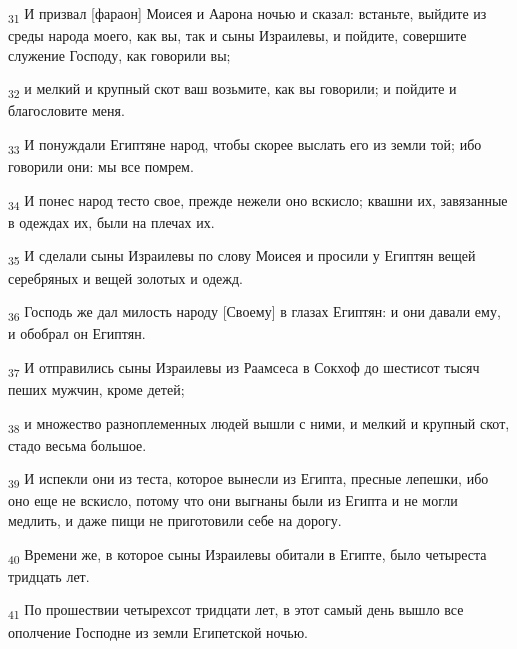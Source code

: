 \begin{tcolorbox}
\textsubscript{31} И призвал [фараон] Моисея и Аарона ночью и сказал: встаньте, выйдите из среды народа моего, как вы, так и сыны Израилевы, и пойдите, совершите служение Господу, как говорили вы;
\end{tcolorbox}
\begin{tcolorbox}
\textsubscript{32} и мелкий и крупный скот ваш возьмите, как вы говорили; и пойдите и благословите меня.
\end{tcolorbox}
\begin{tcolorbox}
\textsubscript{33} И понуждали Египтяне народ, чтобы скорее выслать его из земли той; ибо говорили они: мы все помрем.
\end{tcolorbox}
\begin{tcolorbox}
\textsubscript{34} И понес народ тесто свое, прежде нежели оно вскисло; квашни их, завязанные в одеждах их, были на плечах их.
\end{tcolorbox}
\begin{tcolorbox}
\textsubscript{35} И сделали сыны Израилевы по слову Моисея и просили у Египтян вещей серебряных и вещей золотых и одежд.
\end{tcolorbox}
\begin{tcolorbox}
\textsubscript{36} Господь же дал милость народу [Своему] в глазах Египтян: и они давали ему, и обобрал он Египтян.
\end{tcolorbox}
\begin{tcolorbox}
\textsubscript{37} И отправились сыны Израилевы из Раамсеса в Сокхоф до шестисот тысяч пеших мужчин, кроме детей;
\end{tcolorbox}
\begin{tcolorbox}
\textsubscript{38} и множество разноплеменных людей вышли с ними, и мелкий и крупный скот, стадо весьма большое.
\end{tcolorbox}
\begin{tcolorbox}
\textsubscript{39} И испекли они из теста, которое вынесли из Египта, пресные лепешки, ибо оно еще не вскисло, потому что они выгнаны были из Египта и не могли медлить, и даже пищи не приготовили себе на дорогу.
\end{tcolorbox}
\begin{tcolorbox}
\textsubscript{40} Времени же, в которое сыны Израилевы обитали в Египте, было четыреста тридцать лет.
\end{tcolorbox}
\begin{tcolorbox}
\textsubscript{41} По прошествии четырехсот тридцати лет, в этот самый день вышло все ополчение Господне из земли Египетской ночью.
\end{tcolorbox}
